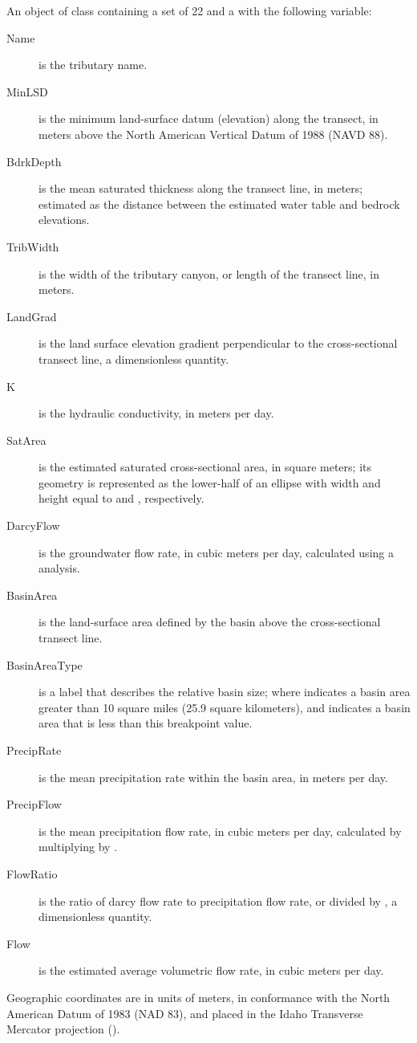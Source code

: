 \documentclass[a4paper]{book}
\begin{document}
\begin{Format}
An object of  class containing a set of 22  and a  with the following variable:
\begin{description}

\item[Name] is the tributary name.
\item[MinLSD] is the minimum land-surface datum (elevation) along the transect, in meters above the North American Vertical Datum of 1988 (NAVD 88).
\item[BdrkDepth] is the mean saturated thickness along the transect line, in meters; estimated as the distance between the estimated water table and bedrock elevations.
\item[TribWidth] is the width of the tributary canyon, or length of the transect line, in meters.
\item[LandGrad] is the land surface elevation gradient perpendicular to the cross-sectional transect line, a dimensionless quantity.
\item[K] is the hydraulic conductivity, in meters per day.
\item[SatArea] is the estimated saturated cross-sectional area, in square meters; its geometry is represented as the lower-half of an ellipse with width and height equal to  and , respectively.
\item[DarcyFlow] is the groundwater flow rate, in cubic meters per day, calculated using a  analysis.
\item[BasinArea] is the land-surface area defined by the basin above the cross-sectional transect line.
\item[BasinAreaType] is a label that describes the relative basin size; where  indicates a basin area greater than 10 square miles (25.9 square kilometers), and  indicates a basin area that is less than this breakpoint value.
\item[PrecipRate] is the mean precipitation rate within the basin area, in meters per day.
\item[PrecipFlow] is the mean precipitation flow rate, in cubic meters per day, calculated by multiplying  by .
\item[FlowRatio] is the ratio of darcy flow rate to precipitation flow rate, or  divided by , a dimensionless quantity.
\item[Flow] is the estimated average volumetric flow rate, in cubic meters per day.

\end{description}

Geographic coordinates are in units of meters, in conformance with the North American Datum of 1983 (NAD 83), and placed in the
Idaho Transverse Mercator projection ().
\end{Format}
\end{document}
